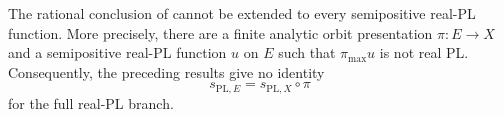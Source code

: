 \begin{proposition}
\label{prop:p031-real-pl-fiber-maximum-failure}
The rational conclusion of  cannot be
extended to every semipositive real-PL function.  More precisely, there are
a finite analytic orbit presentation $\pi:E\to X$ and a semipositive
real-PL function $u$ on $E$ such that $\pi_{\max}u$ is not real PL.
Consequently, the preceding results give no identity
\[
                    s_{\mathrm{PL},E}
                       =s_{\mathrm{PL},X}\circ\pi
\]
for the full real-PL branch.
\end{proposition}
